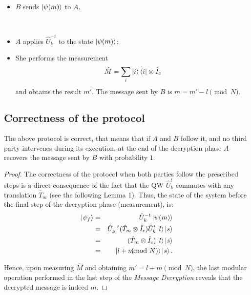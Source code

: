 \begin{protocol}
\begin{description}
\begin{itemize}
	\item $B$ sends $\Ket{\psi(m)}$ to $A$.
	\end{itemize}
	
	\item[\hspace{3mm} {\em Message Decryption}]\
	\begin{itemize}
	\item $A$ applies $\hat{U}_k^{-t}$ to the state $\Ket{\psi(m)}$;

	\item She performs the measurement 
	\begin{equation}
	\hat{M} = \sum_{i}\Ket{i} \Bra{i}\otimes \hat{I}_c
	\end{equation} 
	and obtains the result $m'$. The message sent by $B$ is $m= m' - l \pmod N$.
\end{itemize}
\end{description}
\end{protocol}


\subsection{Correctness of the protocol}

\begin{proposition}
The above protocol  is correct, that means that if $A$ and $B$ follow it, and no third party intervenes during its execution, at the end of the decryption phase $A$ recovers the message sent by $B$ with probability $1$.
\end{proposition}

\begin{proof}
The correctness of the protocol when both parties follow the prescribed steps is a direct consequence of the fact that the QW $\hat{U}_k^t$ commutes with any translation $\hat{T}_m$ (see the following Lemma 1). Thus, the state of the system before the final step of the decryption phase (measurement), is: 
\begin{eqnarray}
\Ket {\psi_f}	&=& \hat{U}_k^{-t}\Ket{\psi(m)} \nonumber\\
			&=& \hat{U}_k^{-t} (\hat{T}_m \otimes \hat{I}_c) \hat{U}_k^t \Ket{l}\Ket{s} \\
			&=& (\hat{T}_m \otimes \hat{I}_c) \Ket{l}\Ket{s} \nonumber\\
			&=& \Ket{l+m  \!\!\!\!\!\pmod N}\Ket{s}.\nonumber
\end{eqnarray}

Hence, upon measuring $\hat{M}$ and obtaining $m' = l+m \!\!\pmod N$, the last modular operation performed in the last step of the {\em Message Decryption} reveals that the decrypted message is indeed $m$. 
\end{proof}


